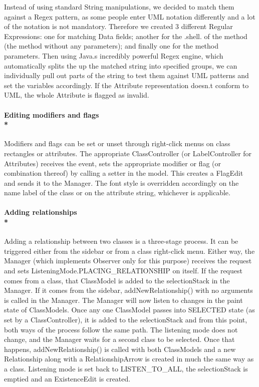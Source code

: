 \hspace{-10pt}Instead of using standard String manipulations, we decided to match them against a Regex pattern, as some people enter UML notation differently and a lot of the notation is not mandatory. Therefore we created 3 different Regular Expressions: one for matching Data fields; another for the .shell. of the method (the method without any parameters); and finally one for the method parameters. Then using Java.s incredibly powerful Regex engine, which automatically splits the up the matched string into specified groups, we can individually pull out parts of the string to test them against UML patterns and set the variables accordingly. If the Attribute representation doesn.t conform to UML, the whole Attribute is flagged as invalid.

\paragraph{\small{\tab Editing modifiers and flags\\*}}

\hspace{-10pt}Modifiers and flags can be set or unset through right-click menus on class rectangles or attributes. The appropriate ClassController (or LabelController for Attributes) receives the event, sets the appropriate modifier or flag (or combination thereof) by calling a setter in the model. This creates a FlagEdit and sends it to the Manager. The font style is overridden accordingly on the name label of the class or on the attribute string, whichever is applicable.

\paragraph{\small{\tab Adding relationships\\*}}

\hspace{-10pt}Adding a relationship between two classes is a three-stage process. It can be triggered either from the sidebar or from a class right-click menu. Either way, the Manager (which implements Observer only for this purpose) receives the request and sets ListeningMode.PLACING\_RELATIONSHIP on itself. If the request comes from a class, that ClassModel is added to the selectionStack in the Manager. If it comes from the sidebar, addNewRelationship() with no arguments is called in the Manager. The Manager will now listen to changes in the paint state of ClassModels. Once any one ClassModel passes into SELECTED state (as set by a ClassController), it is added to the selectionStack and from this point, both ways of the process follow the same path. The listening mode does not change, and the Manager waits for a second class to be selected. Once that happens, addNewRelationship() is called with both ClassModels and a new Relationship along with a RelationshipArrow is created in much the same way as a class.  Listening mode is set back to LISTEN\_TO\_ALL, the selectionStack is emptied and an ExistenceEdit is created.

